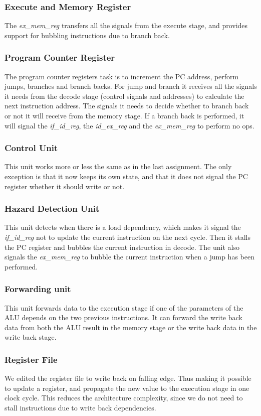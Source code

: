\subsubsection{Execute and Memory Register}
The \textit{ex\_mem\_reg} transfers all the signals from the execute stage, and 
provides support for bubbling instructions due to branch back. 

\subsubsection{Program Counter Register}
The program counter registers task is to increment the PC address, perform 
jumps, branches and branch backs. For jump and branch it receives all the 
signals it needs from the decode stage (control signals and addresses) to 
calculate the next instruction address. The signals it needs to decide 
whether to branch back or not it will receive from the memory stage. If a 
branch back is performed, it will signal the \textit{if\_id\_reg}, the 
\textit{id\_ex\_reg} and 
the \textit{ex\_mem\_reg} to perform no ops. 

\subsubsection{Control Unit}
This unit works more or less the same as in the last assignment.
The only exception is that it now keeps its own state, and that it
does not signal the PC register whether it should write or 
not.

\subsubsection{Hazard Detection Unit}
This unit detects when there is a load dependency, which makes it signal the 
\textit{if\_id\_reg}
not to update the current instruction on the next cycle. Then it stalls the 
PC register and bubbles the current instruction in decode. The unit also
 signals the 
\textit{ex\_mem\_reg} to bubble the current instruction when a jump has been 
performed.

\subsubsection{Forwarding unit}
This unit forwards data to the execution stage if one of the parameters of the ALU 
depends on the two previous instructions. It can forward the write back data 
from both the ALU result in the memory stage or the write back data in the 
write back stage. 

\subsubsection{Register File}
We edited the register file to write back on falling edge. Thus making it 
possible to update a register, and propagate the new value to the execution 
stage in one clock cycle. This reduces the architecture complexity, since we 
do not need to stall instructions due to write back dependencies.
